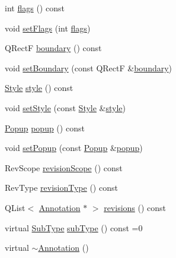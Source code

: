\begin{DoxyCompactItemize}
\item 
int \hyperlink{class_poppler_1_1_annotation_a34a97344409f4ebb1fa9e26d5bc19c71}{flags} () const
\item 
void \hyperlink{class_poppler_1_1_annotation_abb788875ed4ed5e593e979afc70555db}{set\+Flags} (int \hyperlink{class_poppler_1_1_annotation_a34a97344409f4ebb1fa9e26d5bc19c71}{flags})
\item 
Q\+RectF \hyperlink{class_poppler_1_1_annotation_a659d9288f67ff988f75df0fa9d3ca2fb}{boundary} () const
\item 
void \hyperlink{class_poppler_1_1_annotation_ad7632d611ff26ec76cc42d301d2296e9}{set\+Boundary} (const Q\+RectF \&\hyperlink{class_poppler_1_1_annotation_a659d9288f67ff988f75df0fa9d3ca2fb}{boundary})
\item 
\hyperlink{class_poppler_1_1_annotation_1_1_style}{Style} \hyperlink{class_poppler_1_1_annotation_a4857ee8533e1430f5776507f465040a8}{style} () const
\item 
void \hyperlink{class_poppler_1_1_annotation_afa93b9a0da6de47a74b5e296924afc42}{set\+Style} (const \hyperlink{class_poppler_1_1_annotation_1_1_style}{Style} \&\hyperlink{class_poppler_1_1_annotation_a4857ee8533e1430f5776507f465040a8}{style})
\item 
\hyperlink{class_poppler_1_1_annotation_1_1_popup}{Popup} \hyperlink{class_poppler_1_1_annotation_a6db96f04d0f70ceb167e2be0a8e3887f}{popup} () const
\item 
void \hyperlink{class_poppler_1_1_annotation_a583671f690f965995b9be23554722900}{set\+Popup} (const \hyperlink{class_poppler_1_1_annotation_1_1_popup}{Popup} \&\hyperlink{class_poppler_1_1_annotation_a6db96f04d0f70ceb167e2be0a8e3887f}{popup})
\item 
Rev\+Scope \hyperlink{class_poppler_1_1_annotation_ad9fb16c5e50ac91e51f4ea3547eea2ad}{revision\+Scope} () const
\item 
Rev\+Type \hyperlink{class_poppler_1_1_annotation_a1aafb6d259755a1ed36498c70c9837ef}{revision\+Type} () const
\item 
Q\+List$<$ \hyperlink{class_poppler_1_1_annotation}{Annotation} $\ast$ $>$ \hyperlink{class_poppler_1_1_annotation_a9d0a905f8eea751f5b33e38245383ecb}{revisions} () const
\item 
virtual \hyperlink{class_poppler_1_1_annotation_a2d592999c330949d64679cfa9e81113f}{Sub\+Type} \hyperlink{class_poppler_1_1_annotation_aef7fa1532193b41fbeba6e577579d984}{sub\+Type} () const =0
\item 
virtual \hyperlink{class_poppler_1_1_annotation_a1594b95bca33b18fae1bdc1606e28985}{$\sim$\+Annotation} ()
\end{DoxyCompactItemize}
